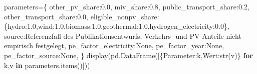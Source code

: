 \documentclass[
  ngerman,
  a4paper,
  DIV=11]{scrreprt}
\newenvironment{Shaded}{\begin{snugshade}}{\end{snugshade}}
\newcommand{\BuiltInTok}[1]{\textcolor[rgb]{0.00,0.23,0.31}{#1}}
\newcommand{\ControlFlowTok}[1]{\textcolor[rgb]{0.00,0.23,0.31}{\textbf{#1}}}
\newcommand{\FloatTok}[1]{\textcolor[rgb]{0.68,0.00,0.00}{#1}}
\newcommand{\KeywordTok}[1]{\textcolor[rgb]{0.00,0.23,0.31}{\textbf{#1}}}
\newcommand{\NormalTok}[1]{\textcolor[rgb]{0.00,0.23,0.31}{#1}}
\newcommand{\OperatorTok}[1]{\textcolor[rgb]{0.37,0.37,0.37}{#1}}
\newcommand{\StringTok}[1]{\textcolor[rgb]{0.13,0.47,0.30}{#1}}
\newcommand{\VariableTok}[1]{\textcolor[rgb]{0.07,0.07,0.07}{#1}}
\begin{document}
\begin{Shaded}
\begin{Highlighting}[]
\NormalTok{parameters}\OperatorTok{=}\NormalTok{\{}
    \StringTok{\textquotesingle{}other\_pv\_share\textquotesingle{}}\NormalTok{:}\FloatTok{0.0}\NormalTok{,}
    \StringTok{\textquotesingle{}miv\_share\textquotesingle{}}\NormalTok{:}\FloatTok{0.8}\NormalTok{,}
    \StringTok{\textquotesingle{}public\_transport\_share\textquotesingle{}}\NormalTok{:}\FloatTok{0.2}\NormalTok{,}
    \StringTok{\textquotesingle{}other\_transport\_share\textquotesingle{}}\NormalTok{:}\FloatTok{0.0}\NormalTok{,}
    \StringTok{\textquotesingle{}eligible\_nonpv\_share\textquotesingle{}}\NormalTok{:\{}\StringTok{\textquotesingle{}hydro\textquotesingle{}}\NormalTok{:}\FloatTok{1.0}\NormalTok{,}\StringTok{\textquotesingle{}wind\textquotesingle{}}\NormalTok{:}\FloatTok{1.0}\NormalTok{,}\StringTok{\textquotesingle{}biomass\textquotesingle{}}\NormalTok{:}\FloatTok{1.0}\NormalTok{,}\StringTok{\textquotesingle{}geothermal\textquotesingle{}}\NormalTok{:}\FloatTok{1.0}\NormalTok{,}\StringTok{\textquotesingle{}hydrogen\_electricity\textquotesingle{}}\NormalTok{:}\FloatTok{0.0}\NormalTok{\},}
    \StringTok{\textquotesingle{}source\textquotesingle{}}\NormalTok{:}\StringTok{\textquotesingle{}Referenzfall des Publikationsentwurfs; Verkehrs{-} und PV{-}Anteile nicht empirisch festgelegt\textquotesingle{}}\NormalTok{,}
    \StringTok{\textquotesingle{}pe\_factor\_electricity\textquotesingle{}}\NormalTok{:}\VariableTok{None}\NormalTok{,}
    \StringTok{\textquotesingle{}pe\_factor\_year\textquotesingle{}}\NormalTok{:}\VariableTok{None}\NormalTok{,}
    \StringTok{\textquotesingle{}pe\_factor\_source\textquotesingle{}}\NormalTok{:}\VariableTok{None}\NormalTok{,}
\NormalTok{\}}
\NormalTok{display(pd.DataFrame([\{}\StringTok{\textquotesingle{}Parameter\textquotesingle{}}\NormalTok{:k,}\StringTok{\textquotesingle{}Wert\textquotesingle{}}\NormalTok{:}\BuiltInTok{str}\NormalTok{(v)\} }\ControlFlowTok{for}\NormalTok{ k,v }\KeywordTok{in}\NormalTok{ parameters.items()]))}
\end{Highlighting}
\end{Shaded}
\end{document}
